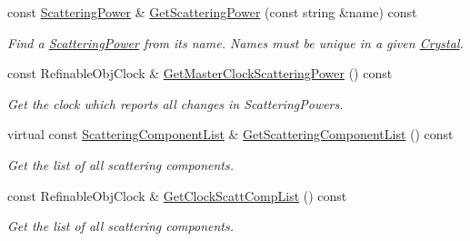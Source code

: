 \begin{DoxyCompactItemize}
\mbox{\label{class_obj_cryst_1_1_crystal_addacbe9291586350c24984cacae00139}} 
const \mbox{\hyperlink{class_obj_cryst_1_1_scattering_power}{Scattering\+Power}} \& \mbox{\hyperlink{class_obj_cryst_1_1_crystal_addacbe9291586350c24984cacae00139}{Get\+Scattering\+Power}} (const string \&name) const
\begin{DoxyCompactList}\small\item\em Find a \mbox{\hyperlink{class_obj_cryst_1_1_scattering_power}{Scattering\+Power}} from its name. Names must be unique in a given \mbox{\hyperlink{class_obj_cryst_1_1_crystal}{Crystal}}. \end{DoxyCompactList}\item 
\mbox{\label{class_obj_cryst_1_1_crystal_afe78d3190beb21efe9c4d524ead73813}} 
const Refinable\+Obj\+Clock \& \mbox{\hyperlink{class_obj_cryst_1_1_crystal_afe78d3190beb21efe9c4d524ead73813}{Get\+Master\+Clock\+Scattering\+Power}} () const
\begin{DoxyCompactList}\small\item\em Get the clock which reports all changes in Scattering\+Powers. \end{DoxyCompactList}\item 
\mbox{\label{class_obj_cryst_1_1_crystal_a5ff33da1575572684743281c92f6596a}} 
virtual const \mbox{\hyperlink{class_obj_cryst_1_1_scattering_component_list}{Scattering\+Component\+List}} \& \mbox{\hyperlink{class_obj_cryst_1_1_crystal_a5ff33da1575572684743281c92f6596a}{Get\+Scattering\+Component\+List}} () const
\begin{DoxyCompactList}\small\item\em Get the list of all scattering components. \end{DoxyCompactList}\item 
\mbox{\label{class_obj_cryst_1_1_crystal_a9b199fd99f7ccd74755bea232f43f8ca}} 
const Refinable\+Obj\+Clock \& \mbox{\hyperlink{class_obj_cryst_1_1_crystal_a9b199fd99f7ccd74755bea232f43f8ca}{Get\+Clock\+Scatt\+Comp\+List}} () const
\begin{DoxyCompactList}\small\item\em Get the list of all scattering components. \end{DoxyCompactList}\item 

\end{DoxyCompactItemize}
